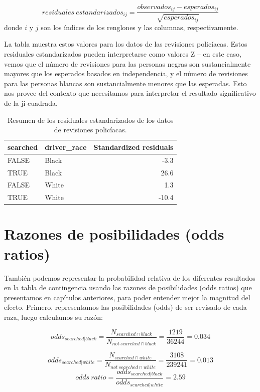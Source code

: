 \documentclass[
  12pt,
]{book}
\theoremstyle{definition}
\theoremstyle{definition}
\theoremstyle{definition}
\theoremstyle{remark}
\begin{document}
\[
residuales\ estandarizados_{ij} = \frac{observados_{ij} - esperados_{ij}}{\sqrt{esperados_{ij}}}
\]
donde \(i\) y \(j\) son los índices de los renglones y las columnas, respectivamente.

La tabla muestra estos valores para los datos de las revisiones policíacas. Estos residuales estandarizados pueden interpretarse como valores Z -- en este caso, vemos que el número de revisiones para las personas negras son sustancialmente mayores que los esperados basados en independencia, y el número de revisiones para las personas blancas son sustancialmente menores que las esperadas. Esto nos provee del contexto que necesitamos para interpretar el resultado significativo de la ji-cuadrada.

\begin{table}

\caption{\label{tab:unnamed-chunk-82}Resumen de los residuales estandarizados de los datos de revisiones policíacas.}
\centering
\begin{tabular}[t]{l|l|r}
\hline
searched & driver\_race & Standardized residuals\\
\hline
FALSE & Black & -3.3\\
\hline
TRUE & Black & 26.6\\
\hline
FALSE & White & 1.3\\
\hline
TRUE & White & -10.4\\
\hline
\end{tabular}
\end{table}

\hypertarget{razones-de-posibilidades-odds-ratios}{%
\section{Razones de posibilidades (odds ratios)}\label{razones-de-posibilidades-odds-ratios}}

También podemos representar la probabilidad relativa de los diferentes resultados en la tabla de contingencia usando las razones de posibilidades (odds ratios) que presentamos en capítulos anteriores, para poder entender mejor la magnitud del efecto. Primero, representamos las posibilidades (odds) de ser revisado de cada raza, luego calculamos su razón:

\[
odds_{searched|black} = \frac{N_{searched\cap black}}{N_{not\ searched\cap black}} = \frac{1219}{36244} = 0.034
\]

\[
odds_{searched|white} = \frac{N_{searched\cap white}}{N_{not\ searched\cap white}} = \frac{3108}{239241} = 0.013
\]
\[
odds\ ratio = \frac{odds_{searched|black}}{odds_{searched|white}} = 2.59
\]
\end{document}
